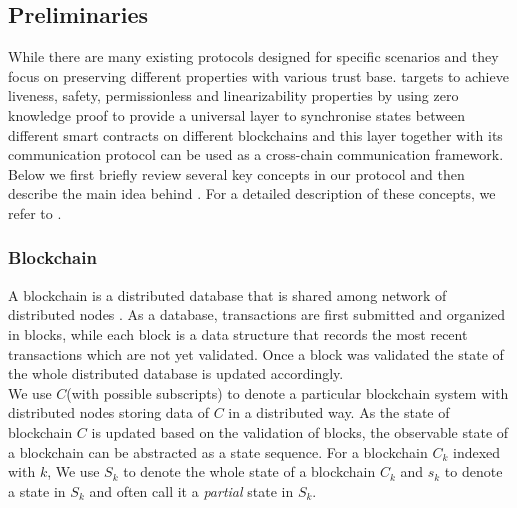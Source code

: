 \documentclass[pageno]{jpaper}
\begin{document}
\subsection{Preliminaries}
\label{prelimiary}
While there are many existing protocols designed for specific scenarios and they focus on preserving different properties with various trust base. \dprotocol targets to achieve liveness, safety, permissionless and linearizability properties by using zero knowledge proof to provide a universal layer to synchronise states between different smart contracts on different blockchains and this layer together with its communication protocol can be used as a cross-chain communication framework. Below we first briefly review several key concepts in our protocol and then describe the main idea behind \dprotocol. For a detailed description of these concepts, we refer to \cite{robinson2021survey}. 
\\
\subsubsection{Blockchain}
A blockchain is a distributed database that is shared among network of distributed nodes \cite{chen2018survey}. As a database, transactions are first submitted and organized in blocks, while each block is a data structure that records the most recent transactions which are not yet validated. Once a block was validated the state of the whole distributed database is updated accordingly.\\
\newline
We use $C$(with possible subscripts) to denote a particular blockchain system with distributed nodes storing data of $C$ in a distributed way. As the state of blockchain $C$ is updated based on the validation of blocks, the observable state of a blockchain can be abstracted as a state sequence. For a blockchain $C_k$ indexed with $k$, We use $S_k$ to denote the whole state of a blockchain $C_{k}$ and $s_k$ to denote a state in $S_k$ and often call it a \emph{partial} state in $S_k$.
\\
\end{document}
